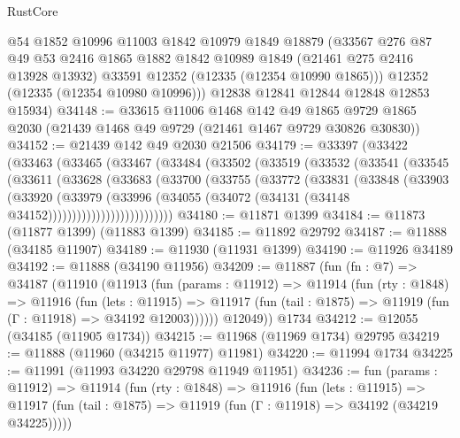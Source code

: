 \begin{lexlean}{RustCore}
\begin{coremodule}
        @54
        @1852
        @10996
        @11003
        @1842
        @10979
        @1849
        @18879
        (@33567
          @276
          @87
          @49
          @53
          @2416
          @1865
          @1882
          @1842
          @10989
          @1849
          (@21461 @275 @2416 @13928 @13932)
          @33591
          @12352
          (@12335 (@12354 @10990 @1865)))
        @12352
        (@12335 (@12354 @10980 @10996)))
      @12838
      @12841
      @12844
      @12848
      @12853
      @15934)
@34148 := @33615
    @11006
    @1468
    @142
    @49
    @1865
    @9729
    @1865
    @2030
    (@21439 @1468 @49 @9729 (@21461 @1467 @9729 @30826 @30830))
@34152 := @21439 @142 @49 @2030 @21506
@34179 := @33397
    (@33422
      (@33463
        (@33465
          (@33467
            (@33484
              (@33502
                (@33519
                  (@33532
                    (@33541
                      (@33545
                        (@33611
                          (@33628
                            (@33683
                              (@33700
                                (@33755
                                  (@33772
                                    (@33831
                                      (@33848
                                        (@33903
                                          (@33920
                                            (@33979
                                              (@33996
                                                (@34055
                                                  (@34072
                                                    (@34131 (@34148 @34152))))))))))))))))))))))))))
@34180 := @11871 @1399
@34184 := @11873 (@11877 @1399) (@11883 @1399)
@34185 := @11892 @29792
@34187 := @11888 (@34185 @11907)
@34189 := @11930 (@11931 @1399)
@34190 := @11926 @34189
@34192 := @11888 (@34190 @11956)
@34209 := @11887
    (fun (fn : @7) =>
    @34187
      (@11910
        (@11913
          (fun (params : @11912) =>
          @11914
            (fun (rty : @1848) =>
            @11916
              (fun (lets : @11915) =>
              @11917 (fun (tail : @1875) => @11919 (fun (Γ : @11918) => @34192 @12003))))))
        @12049))
    @1734
@34212 := @12055 (@34185 (@11905 @1734))
@34215 := @11968 (@11969 @1734) @29795
@34219 := @11888 (@11960 (@34215 @11977) @11981)
@34220 := @11994 @1734
@34225 := @11991 (@11993 @34220 @29798 @11949 @11951)
@34236 := fun (params : @11912) =>
  @11914
    (fun (rty : @1848) =>
    @11916
      (fun (lets : @11915) =>
      @11917 (fun (tail : @1875) => @11919 (fun (Γ : @11918) => @34192 (@34219 @34225)))))

\end{coremodule}
\end{lexlean}

